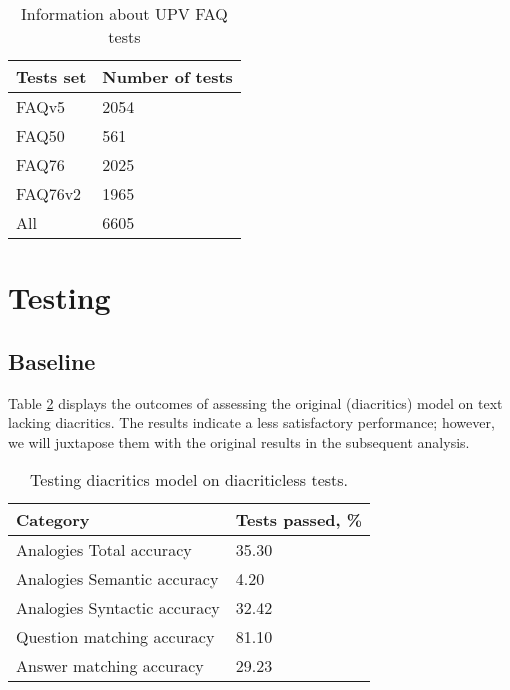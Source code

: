 \documentclass{article}
\begin{document}
\begin{table}[h]
  \centering
  \begin{tabular}{ |p{2cm}||p{2.5cm}| }
    \hline
    Tests set & Number of tests \\
    \hline
    FAQv5     & 2054            \\
    FAQ50     & 561             \\
    FAQ76     & 2025            \\
    FAQ76v2   & 1965            \\
    \hline
    \hline
    All       & 6605            \\
    \hline
  \end{tabular}
  \caption{Information about UPV FAQ tests}
  \label{UPV_FAQ_info}
\end{table}



\section{Testing}

\subsection{Baseline}

Table \ref{testing_diacritics_diacriticless} displays the outcomes of assessing the original (diacritics) model on text lacking diacritics.
The results indicate a less satisfactory performance; however, we will juxtapose them with the original results in the subsequent analysis.

\begin{table}[h]
  \centering
  \begin{tabular}{ |p{4.5cm}||p{2.5cm}| }
    \hline
    Category                     & Tests passed, \% \\
    \hline
    Analogies Total accuracy     & 35.30            \\
    Analogies Semantic accuracy  & 4.20             \\
    Analogies Syntactic accuracy & 32.42            \\
    \hline
    \hline
    Question matching accuracy   & 81.10            \\
    Answer matching accuracy     & 29.23            \\
    \hline
  \end{tabular}
  \caption{Testing diacritics model on diacriticless tests.}
  \label{testing_diacritics_diacriticless}
\end{table}
\end{document}
